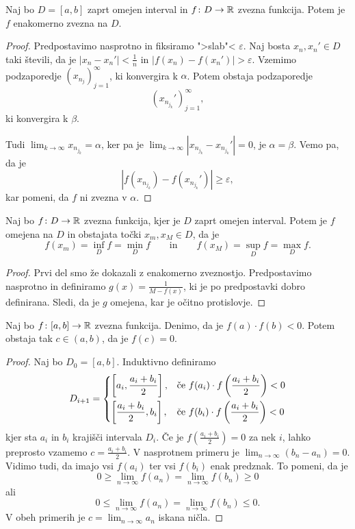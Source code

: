 \documentclass[12pt, a4paper]{article}
\begin{document}
\begin{izrek}
Naj bo $D=[a,b]$ zaprt omejen interval in $f\colon D\to\mathbb{R}$ zvezna funkcija. Potem je $f$ enakomerno zvezna na $D$.
\end{izrek}

\begin{proof}
Predpostavimo nasprotno in fiksiramo ">slab"< $\varepsilon$. Naj bosta $x_n,x_n'\in D$ taki števili, da je $|x_n-x_n'|<\frac{1}{n}$ in $|f(x_n)-f(x_n')|>\varepsilon$. Vzemimo podzaporedje $\left(x_{n_j}\right)_{j=1}^\infty$, ki konvergira k $\alpha$. Potem obstaja podzaporedje
\[
\left(x_{n_{j_k}}'\right)_{j=1}^\infty,
\]
ki konvergira k $\beta$.

Tudi $\displaystyle\lim_{k\to\infty}x_{n_{j_k}}=\alpha$, ker pa je $\displaystyle\lim_{k\to\infty}\left|x_{n_{j_k}}-x_{n_{j_k}}'\right|=0$, je $\alpha=\beta.$ Vemo pa, da je
\[
\left|f\left(x_{n_{j_k}}\right)-f\left(x_{n_{j_k}}'\right)\right|\geq\varepsilon,
\]
kar pomeni, da $f$ ni zvezna v $\alpha$.
\end{proof}

\begin{izrek}
Naj bo $f\colon D\to\mathbb{R}$ zvezna funkcija, kjer je $D$ zaprt omejen interval. Potem je $f$ omejena na $D$ in obstajata točki $x_m,x_M\in D$, da je
\[
f(x_m)=\inf_D f=\min_D f\qquad\text{in}\qquad f(x_M)=\sup_D f=\max_D f.
\]
\end{izrek}

\begin{proof}
Prvi del smo že dokazali z enakomerno zveznostjo. Predpostavimo nasprotno in definiramo $g(x)=\frac{1}{M-f(x)}$, ki je po predpostavki dobro definirana. Sledi, da je $g$ omejena, kar je očitno protislovje.
\end{proof}

\begin{izrek}
Naj bo $f\colon [a,b]\to\mathbb{R}$ zvezna funkcija. Denimo, da je $f(a)\cdot f(b)<0$. Potem obstaja tak $c\in(a,b)$, da je $f(c)=0$.
\end{izrek}

\begin{proof}
Naj bo $D_0=[a,b]$. Induktivno definiramo
\[
D_{i+1}=\begin{dcases}
\left[a_i,\frac{a_i+b_i}{2}\right], &\text{če $f(a_i)\cdot f\left(\frac{a_i+b_i}{2}\right)<0$}
\\
\left[\frac{a_i+b_i}{2},b_i\right], &\text{če $f(b_i)\cdot f\left(\frac{a_i+b_i}{2}\right)<0$}
\end{dcases}
\]
kjer sta $a_i$ in $b_i$ krajišči intervala $D_i$. Če je $f\left(\frac{a_i+b_i}{2}\right)=0$ za nek $i$, lahko preprosto vzamemo $c=\frac{a_i+b_i}{2}$. V nasprotnem primeru je $\displaystyle\lim_{n\to\infty}(b_n-a_n)=0$. Vidimo tudi, da imajo vsi $f(a_i)$ ter vsi $f(b_i)$ enak predznak. To pomeni, da je
\[
0\geq \lim_{n\to\infty}f(a_n)=\lim_{n\to\infty}f(b_n)\geq 0
\]
ali
\[
0\leq \lim_{n\to\infty}f(a_n)=\lim_{n\to\infty}f(b_n)\leq 0.
\]
V obeh primerih je $c=\displaystyle\lim_{n\to\infty}a_n$ iskana ničla.
\end{proof}
\end{document}

